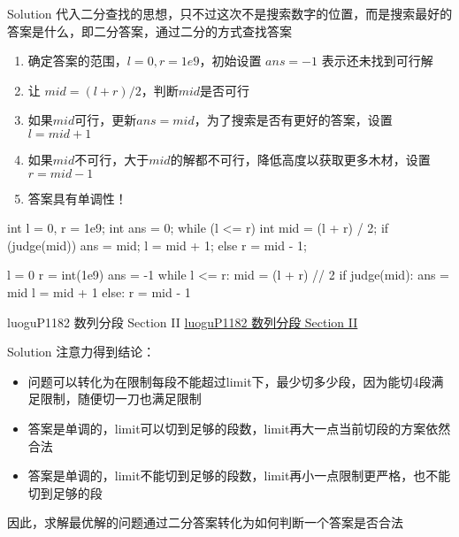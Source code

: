 \documentclass[aspectratio=169,xcolor=dvipsnames]{beamer}
\begin{document}
\begin{frame}[fragile]{Solution}
    代入二分查找的思想，只不过这次不是搜索数字的位置，而是搜索最好的答案是什么，即二分答案，通过二分的方式查找答案
    \begin{enumerate}
        \item 确定答案的范围，$l=0,r=1e9$，初始设置 $ans=-1$ 表示还未找到可行解
        \item 让 $mid=(l+r)/2$，判断$mid$是否可行
        \item 如果$mid$可行，更新$ans=mid$，为了搜索是否有更好的答案，设置$l=mid+1$
        \item 如果$mid$不可行，大于$mid$的解都不可行，降低高度以获取更多木材，设置$r=mid-1$
        \item 答案具有单调性！
    \end{enumerate}
    \begin{minipage}{0.45\textwidth}
        \centering
        \begin{cppcode}
    int l = 0, r = 1e9;
    int ans = 0;
    while (l <= r) {
        int mid = (l + r) / 2;
        if (judge(mid)) {
            ans = mid;
            l = mid + 1;
        } else
            r = mid - 1;
    }
        \end{cppcode}
    \end{minipage}%
    \hfill
    \begin{minipage}{0.45\textwidth}
        \centering
        \begin{pycode}
    l = 0
    r = int(1e9)
    ans = -1
    while l <= r:
        mid = (l + r) // 2
        if judge(mid):
            ans = mid
            l = mid + 1
        else:
            r = mid - 1
        \end{pycode}
    \end{minipage}
\end{frame}


\begin{frame}{luoguP1182 数列分段 Section II}
    \href{https://www.luogu.com.cn/problem/P1182}{luoguP1182 数列分段 Section II}
\end{frame}

\begin{frame}{Solution}
    注意力得到结论：
    \begin{itemize}
        \item 问题可以转化为在限制每段不能超过limit下，最少切多少段，因为能切4段满足限制，随便切一刀也满足限制
        \item 答案是单调的，limit可以切到足够的段数，limit再大一点当前切段的方案依然合法
        \item 答案是单调的，limit不能切到足够的段数，limit再小一点限制更严格，也不能切到足够的段
    \end{itemize}
    因此，求解最优解的问题通过二分答案转化为如何判断一个答案是否合法
\end{frame}
\end{document}
